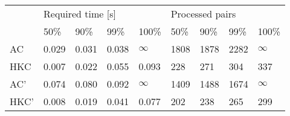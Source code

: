 \begin{tabular}{l|llll|llll}
\multirow{2}{*}{} & \multicolumn{4}{l|}{Required time {[}s{]}} & \multicolumn{4}{l}{Processed pairs} \\ \cline{2-9}
                  & 50\%     & 90\%     & 99\%    & 100\%      & 50\%   & 90\%   & 99\%  & 100\%     \\ \hline
AC                & 0.029    & 0.031    & 0.038   & $\infty$   & 1808   & 1878   & 2282  & $\infty$  \\
HKC               & 0.007    & 0.022    & 0.055   & 0.093      & 228    & 271    & 304   & 337       \\
AC'               & 0.074    & 0.080    & 0.092   & $\infty$   & 1409   & 1488   & 1674  & $\infty$  \\
HKC'              & 0.008    & 0.019    & 0.041   & 0.077      & 202    & 238    & 265   & 299
\end{tabular}
